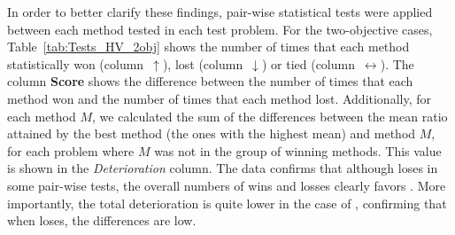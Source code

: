 In order to better clarify these findings, pair-wise statistical tests were applied between each method tested in each test problem.
%
For the two-objective cases, Table~\ref{tab:Tests_HV_2obj} shows the number of times that each method statistically won 
(column~$\uparrow$), lost (column~$\downarrow$) or tied (column~$\leftrightarrow$).
%
The column \textbf{Score} shows the difference between the number of times that each method won and the number of times that each 
method lost.
%
Additionally, for each method $M$, we calculated the sum of the differences between the mean \HV{} ratio attained by the best method 
(the ones with the highest mean) and method $M$, for each problem where $M$ was not in the group of winning methods.
%
This value is shown in the \textit{Deterioration} column.
%
The data confirms that although \AVSDMOEAD{} loses in some pair-wise tests, the overall numbers of wins and 
losses clearly favors \AVSDMOEAD{}.
%
More importantly, the total deterioration is quite lower in the case of \AVSDMOEAD{}, confirming that when \AVSDMOEAD{} loses, 
the differences are low.





